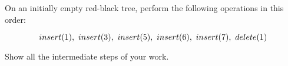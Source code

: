 On an initially empty red-black tree, perform the following operations
in this order:

$$insert(1), \hbox{    }insert(3), \hbox{    } insert(5), \hbox{    }
insert(6),
\hbox{    } insert(7), \hbox{    } delete(1)$$

Show all the intermediate steps of your work.

